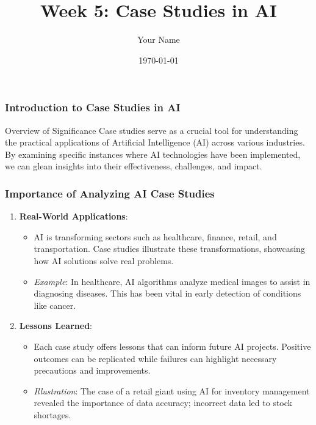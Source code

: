 \documentclass{beamer}
\title{Week 5: Case Studies in AI}
\author{Your Name}
\institute{Your Institution}
\date{\today}
\begin{document}
\frame{\titlepage}

\begin{frame}[fragile]
    \frametitle{Introduction to Case Studies in AI}
    \begin{block}{Overview of Significance}
        Case studies serve as a crucial tool for understanding the practical applications of Artificial Intelligence (AI) across various industries. By examining specific instances where AI technologies have been implemented, we can glean insights into their effectiveness, challenges, and impact.
    \end{block}
\end{frame}

\begin{frame}[fragile]
    \frametitle{Importance of Analyzing AI Case Studies}
    \begin{enumerate}
        \item \textbf{Real-World Applications}: 
            \begin{itemize}
                \item AI is transforming sectors such as healthcare, finance, retail, and transportation. Case studies illustrate these transformations, showcasing how AI solutions solve real problems.
                \item \textit{Example}: In healthcare, AI algorithms analyze medical images to assist in diagnosing diseases. This has been vital in early detection of conditions like cancer.
            \end{itemize}
        \item \textbf{Lessons Learned}: 
            \begin{itemize}
                \item Each case study offers lessons that can inform future AI projects. Positive outcomes can be replicated while failures can highlight necessary precautions and improvements.
                \item \textit{Illustration}: The case of a retail giant using AI for inventory management revealed the importance of data accuracy; incorrect data led to stock shortages.
            \end{itemize}
    \end{enumerate}
\end{frame}
\end{document}
